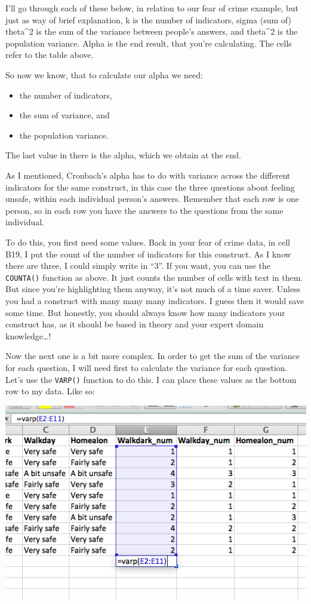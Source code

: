 \documentclass[
]{book}
\providecommand{\tightlist}{%
  \setlength{\itemsep}{0pt}\setlength{\parskip}{0pt}}
\begin{document}
I'll go through each of these below, in relation to our fear of crime example, but just as way of brief explanation, k is the number of indicators, sigma (sum of) theta\^{}2 is the sum of the variance between people's answers, and theta\^{}2 is the population variance. Alpha is the end result, that you're calculating. The cells refer to the table above.

So now we know, that to calculate our alpha we need:

\begin{itemize}
\tightlist
\item
  the number of indicators,
\item
  the sum of variance, and
\item
  the population variance.
\end{itemize}

The last value in there is the alpha, which we obtain at the end.

As I mentioned, Cronbach's alpha has to do with variance across the different indicators for the same construct, in this case the three questions about feeling unsafe, within each individual person's answers. Remember that each row is one person, so in each row you have the answers to the questions from the same individual.

To do this, you first need some values. Back in your fear of crime data, in cell B19, I put the count of the number of indicators for this construct. As I know there are three, I could simply write in ``3''. If you want, you can use the \texttt{COUNTA()} function as above. It just counts the number of cells with text in them. But since you're highlighting them anyway, it's not much of a time saver. Unless you had a construct with many many many indicators. I guess then it would save some time. But honestly, you should always know how many indicators your construct has, as it should be based in theory and your expert domain knowledge\ldots!

Now the next one is a bit more complex. In order to get the sum of the variance for each question, I will need first to calculate the variance for each question. Let's use the \texttt{VARP()} function to do this. I can place these values as the bottom row to my data. Like so:

\includegraphics{imgs/varp_alpha.png}
\end{document}
